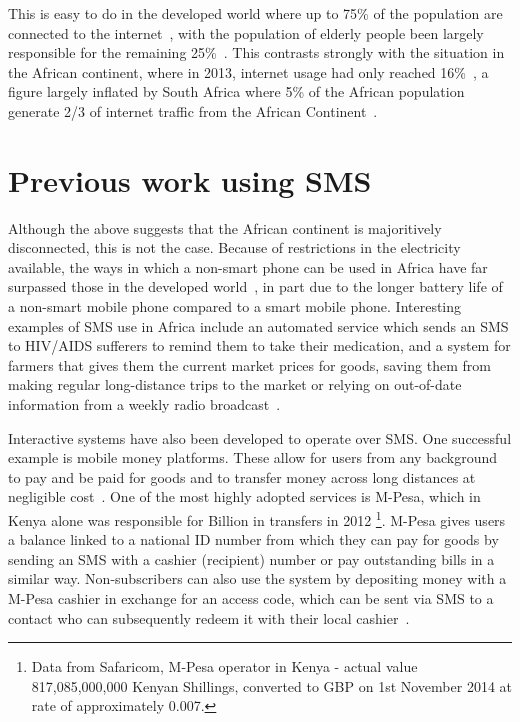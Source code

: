 \documentclass[authoryearcitations]{UoYCSproject}
\begin{document}
This is easy to do in the developed world where up to 75\% of the population are connected to the internet~\cite{ITU_Cell_Usage_2013}, with the population of elderly people been largely responsible for the remaining 25\%~\cite{Gov_Internet_Usage_UK_2014}.  This contrasts strongly with the situation in the African continent, where in 2013, internet usage had only reached 16\%~\cite{ITU_Cell_Usage_2013}, a figure largely inflated by South Africa where 5\% of the African population generate 2/3 of internet traffic from the African Continent~\cite{ITU_Cell_Usage_2013}.

\section{Previous work using SMS}
Although the above suggests that the African continent is majoritively disconnected, this is not the case.  Because of restrictions in the electricity available, the ways in which a non-smart phone can be used in Africa have far surpassed those in the developed world~\cite{Fox:2011:Online}, in part due to the longer battery life of a non-smart mobile phone compared to a smart mobile phone.  Interesting examples of SMS use in Africa include an automated service which sends an SMS to HIV/AIDS sufferers to remind them to take their medication, and a system for farmers that gives them the current market prices for goods, saving them from making regular long-distance trips to the market or relying on out-of-date information from a weekly radio broadcast~\cite{Aker_Mobile_Phones_2010}.

Interactive systems have also been developed to operate over SMS.  One successful example is mobile money platforms.  These allow for users from any background to pay and be paid for goods and to transfer money across long distances at negligible cost~\cite{Aker_Mobile_Phones_2010}.  One of the most highly adopted services is M-Pesa, which in Kenya alone was responsible for  Billion in transfers in 2012 \footnote{Data from Safaricom, M-Pesa operator in Kenya - actual value 817,085,000,000 Kenyan Shillings, converted to GBP on 1st November 2014 at rate of approximately 0.007.}.  M-Pesa gives users a balance linked to a national ID number from which they can pay for goods by sending an SMS with a cashier (recipient) number or pay outstanding bills in a similar way.  Non-subscribers can also use the system by depositing money with a M-Pesa cashier in exchange for an access code, which can be sent via SMS to a contact who can subsequently redeem it with their local cashier~\cite{Aker_Mobile_Phones_2010}.
\end{document}
